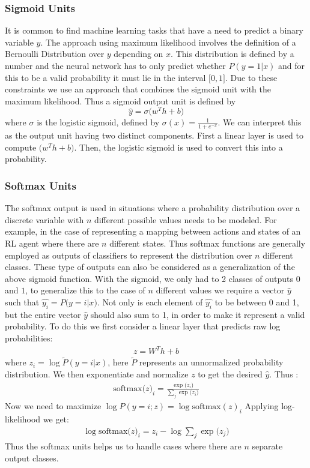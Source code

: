 \documentclass[14pt]{extarticle}
\numberwithin{equation}{section}
\begin{document}
	\subsubsection{Sigmoid Units}		
	It is common to find machine learning tasks that have a need to predict a binary variable $y$. The approach using maximum likelihood involves the definition of a Bernoulli Distribution over $y$ depending on $x$. This distribution is defined by a number and the neural network has to only predict whether $P(y=1 | x)$ and for this to be a valid probability it must lie in the interval $\big[0,1\big]$. Due to these constraints we use an approach that combines the sigmoid unit with the maximum likelihood. Thus a sigmoid output unit is defined by 
	\begin{equation}
	\hat{y} = \sigma\big(w^T h + b\big)
	\end{equation}
	where $\sigma$ is the logistic sigmoid, defined by $\sigma(x) = \frac{1}{1 + e^{-x} }$. We can interpret this as the output unit having two distinct components. First a linear layer is used to compute $\big(w^T h + b\big)$. Then, the logistic sigmoid is used to convert this into a probability.
	\subsubsection{Softmax Units}		\label{softmax}
	The softmax output is used in situations where a probability distribution over a discrete variable with $n$ different possible values needs to be modeled. For example, in the case of representing a mapping between actions and states of an RL agent where there are $n$ different states. Thus softmax functions are generally employed as outputs of classifiers to represent the distribution over $n$ different classes. These type of outputs can also be considered as a generalization of the above sigmoid function. With the sigmoid, we only had to 2 classes of outputs $0$ and $1$, to generalize this to the case of $n$ different values we require a vector $\hat{y}$ such that $\hat{y_i} = P\big(y=i | x\big)$. Not only is each element of $\hat{y_i}$ to be between 0 and 1, but the entire vector $\hat{y}$ should also sum to 1, in order to make it represent a valid probability. To do this we first consider a linear layer that predicts raw log probabilities:
	\begin{align}
	z = W^T h + b 
	\end{align} 
	where $z_i =\log \tilde{P}(y = i | x)$, here $\tilde{P}$ represents an unnormalized probability distribution. We then exponentiate and normalize $z$ to get the desired $\hat{y}$. Thus :
	\begin{align}
	\text{softmax}\big(z\big)_i = \frac{\exp\big(z_i\big)}{\sum_{j}\exp\big(z_i\big)}
	\end{align}
	Now we need to maximize $\log P(y=i;z) = \log \text{softmax}(z)_i $ Applying log-likelihood we get:
	\begin{align}
	\log \text{softmax}\big(z\big)_i = z_i - \log \sum_{j}\exp\big(z_j\big)
	\end{align}
	Thus the softmax units helps us to handle cases where there are $n$ separate output classes.
\end{document}
